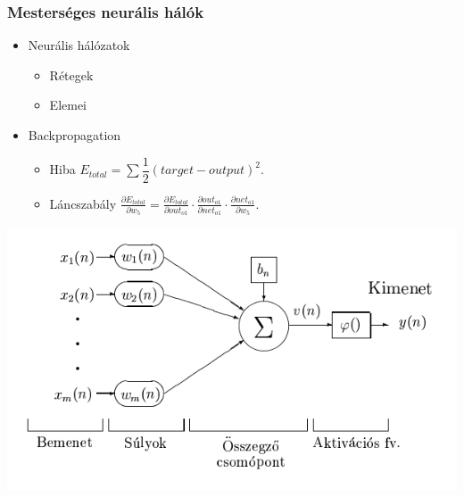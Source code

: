 \documentclass{beamer}
\begin{document}
\begin{frame}[fragile]
\frametitle{Mesterséges neurális hálók}
\begin{itemize}
\item Neurális hálózatok
	\begin{itemize}
	\item Rétegek
	\item Elemei
	\end{itemize}
\item Backpropagation
	\begin{itemize}
	\item Hiba $E_{total} = \sum \dfrac{1}{2}(target - output)^2.$
	\item Láncszabály $\frac{\partial E_{total}}{\partial w_{5}} = \frac{\partial E_{total}}{\partial out_{o1}} \cdot \frac{\partial out_{o1}}{\partial net_{o1}} \cdot \frac{\partial net_{o1}}{\partial w_{5}}.$
	\end{itemize}
\end{itemize}
\includegraphics[scale=0.4, center]{ANNParts}

\end{frame}
\end{document}
